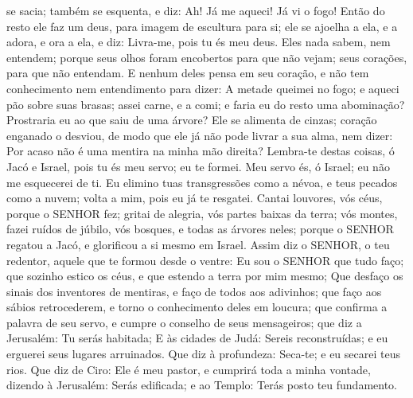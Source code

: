 {{} se sacia; também se esquenta, e diz: Ah! Já me aqueci! Já vi o fogo!
  Então do resto ele faz um deus, para imagem de escultura para si; ele se ajoelha a ela, e a adora, e ora a ela, e diz: Livra-me, pois tu és meu deus.
  Eles nada sabem, nem entendem; porque seus olhos foram encobertos para que não vejam;
{} seus corações, para que não entendam.
  E nenhum deles pensa
{} em seu coração, e não tem conhecimento nem entendimento para dizer: A metade queimei no fogo; e aqueci pão sobre suas brasas; assei carne, e a comi; e faria eu do resto uma abominação? Prostraria eu ao que saiu de uma árvore?
  Ele se alimenta de cinzas;
{} coração enganado o desviou, de modo que ele já não pode livrar a sua alma, nem dizer: Por acaso não é uma mentira
{} na minha mão direita?
  Lembra-te destas coisas, ó Jacó e Israel, pois tu és meu servo; eu te formei. Meu servo és, ó Israel; eu não me esquecerei de ti.
  Eu elimino tuas transgressões como a névoa, e teus pecados como a nuvem; volta a mim, pois eu já te resgatei.
  Cantai louvores, vós céus, porque o SENHOR
{} fez; gritai de alegria, vós partes baixas da terra; vós montes, fazei ruídos de júbilo,
{} vós bosques, e todas as árvores neles; porque o SENHOR regatou a Jacó, e glorificou a si mesmo em Israel.
  Assim diz o SENHOR, o teu redentor, aquele que te formou desde o ventre: Eu sou o SENHOR que tudo faço; que sozinho estico os céus, e que estendo a terra por mim mesmo;
  Que desfaço os sinais dos inventores de mentiras, e faço de todos aos adivinhos; que faço aos sábios retrocederem, e torno o conhecimento deles em loucura;
   que confirma a palavra de seu servo, e cumpre o conselho de seus mensageiros; que diz a Jerusalém: Tu serás habitada; E às cidades de Judá: Sereis reconstruídas; e eu erguerei seus lugares arruinados.
  Que diz à profundeza: Seca-te; e eu secarei teus rios.
  Que diz de Ciro: Ele é meu pastor, e cumprirá toda a minha vontade, dizendo à Jerusalém: Serás edificada; e ao Templo: Terás posto teu fundamento.
\par }

